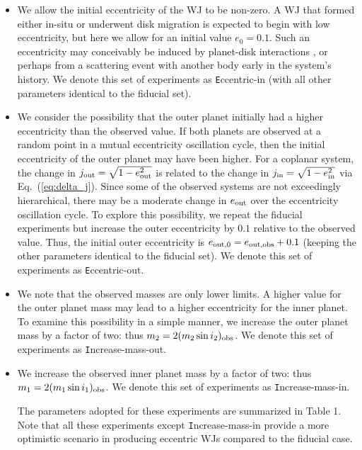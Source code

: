 \documentclass[12pt,useAMS, usenatbib]{mn2e}
\newcommand{\In}{{\rm in}}
\newcommand{\Out}{{\rm out}}
\newcommand{\eout}{e_\Out}
\begin{document}
\begin{itemize}
\item We allow the initial eccentricity of the WJ to be non-zero.  A WJ that formed either in-situ or underwent disk migration is expected to begin with low eccentricity, but here we allow for an initial value $e_0 = 0.1$.  Such an eccentricity may conceivably be induced by planet-disk interactions \citep[e.g.][]{goldreich2003,tsang2014,duffell2015}, or perhaps from a scattering event with another body early in the system's history.  We denote this set of experiments as {\texttt Eccentric-in} (with all other parameters identical to the fiducial set).

\item We consider the possibility that the outer planet initially had a higher eccentricity than the observed value.  If both planets are observed at a random point in a mutual eccentricity oscillation cycle, then the initial eccentricity of the outer planet may have been higher.  For a coplanar system, the change in $j_\Out = \sqrt{1 - \eout^2}$ is related to the change in $j_\In = \sqrt{1 - e_\In^2}$ via Eq.~(\ref{eq:delta_j}).
Since some of the observed systems are not exceedingly hierarchical, there may be a moderate change in $\eout$ over the eccentricity oscillation cycle.  To explore this possibility, we repeat the fiducial experiments but increase the outer eccentricity by $0.1$ relative to the observed value.  Thus, the initial outer eccentricity is $e_{\Out,0} = e_{\Out,\rm obs} + 0.1$ (keeping the other parameters identical to the fiducial set).  We denote this set of experiments as {\texttt Eccentric-out}.

\item We note that the observed masses are only lower limits.  A higher value for the outer planet mass may lead to a higher eccentricity for the inner planet.  To examine this possibility in a simple manner, we increase the outer planet mass by a factor of two: thus $m_2 = 2 (m_2 \sin{i_2})_{\rm obs}$. We denote this set of experiments as {\texttt Increase-mass-out}.

\item We increase the observed inner planet mass by a factor of two: thus $m_1 = 2 (m_1 \sin{i_1})_{\rm obs}$.   We denote this set of experiments as {\texttt Increase-mass-in}.

The parameters adopted for these experiments are summarized in Table 1.  Note that all these experiments except {\texttt Increase-mass-in} provide a more optimistic scenario in producing eccentric WJs compared to the fiducial case.
\end{itemize}
\end{document}
